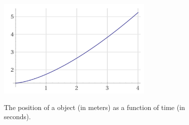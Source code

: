 \documentclass[12pt]{article}
\begin{document}
\begin{figure}[h]
\begin{center}
\vspace{1mm}
\includegraphics[width=3.0in]{graph_HW04_1.png}
\vspace{-1mm}
\caption{The position of a object (in meters) as a function of time
  (in seconds). }
\vspace{-5mm}
\label{fig:graph1}
\end{center}
\end{figure}
\end{document}
